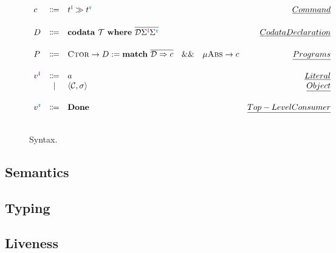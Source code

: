 \begin{figure}[H]
\[\begin{array}{lclr}
    c
    & \Coloneqq
    & t^{\polprd} \mkCmd t^{\polcon}
    & \emph{Command}
    \\[0.5cm]

    D
    & \Coloneqq
    & \codata\
      \mathcal{T}\
      \where\
      \overline{\mathcal{D}\Sigma^{\polprd}\Sigma^{\polcon}}\
    & \emph{Codata Declaration}
    \\[0.5cm]

    P
    & \Coloneqq
    & \textsc{Ctor} \to D
      := \match\
         \overline{\mathcal{D} \Rightarrow c}
      \quad
      \&\&
      \quad
      \mu\textsc{Abs} \to c
    & \emph{Programs}
    \\[0.5cm]

    v^{\polprd}
    & \Coloneqq
    & a
    & \emph{Literal}
    \\
    & | & \langle \mathcal{C}, \sigma \rangle
    & \emph{Object}
    \\[0.5cm]

    v^{\polcon}
    & \Coloneqq
    & \Done
    & \emph{Top-Level Consumer}
    \\[0.5cm]
  \end{array}
  \]
  \caption{Syntax.}
  \label{fig:?:syntax}
\end{figure}

\subsection{Semantics}

\subsection{Typing}

\subsection{Liveness}


